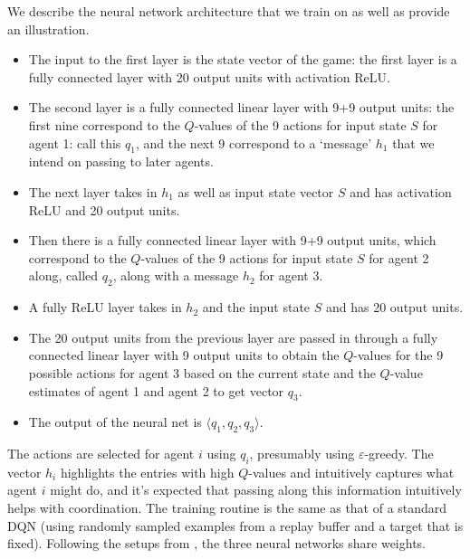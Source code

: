 \documentclass{article}
\begin{document}
We describe the neural network architecture that we train
on as well as provide an illustration.
\begin{itemize}

\item The input to the first layer is the state vector of
the game: the first layer is a fully connected layer
with 20 output units with activation ReLU.

\item The second layer is a fully connected linear layer
with 9+9 output units: the first nine correspond to the $Q$-values
of the 9 actions for input state $S$ for agent 1: call
this $q_1$, and the next 9 correspond to a `message' $h_1$ that
we intend on passing to later agents.

\item The next layer takes in $h_1$ as well as input
state vector $S$ and has activation ReLU and 20 output
units.

\item Then there is a fully connected linear layer with
9+9 output units, which correspond to the $Q$-values
of the 9 actions for input state $S$ for agent 2
along, called $q_2$, along with a message $h_2$
for agent 3.

\item A fully ReLU layer takes in $h_2$ and the input
state $S$ and has 20 output units.

\item The 20 output units from the previous layer are
passed in through a fully connected linear layer with
9 output units to obtain the $Q$-values for the 9
possible actions for agent 3 based on the current state
and the $Q$-value estimates of agent 1 and agent 2
to get vector $q_3$.

\item The output of the neural net is $\langle q_1,q_2,q_3
\rangle$.

\end{itemize}

The actions are selected for agent $i$ using $q_i$,
presumably using $\varepsilon$-greedy.
The vector $h_i$ highlights the entries with
high $Q$-values and intuitively captures
what agent $i$ might do, and it's expected that
passing along this information intuitively helps
with coordination. The training routine is the same as that
of a standard DQN (using randomly sampled examples from
a replay buffer and a target that is fixed).
Following the setups from \cite{foerster2016learning,
sukhbaatar2016learning}, the three neural networks share
weights.
\end{document}

